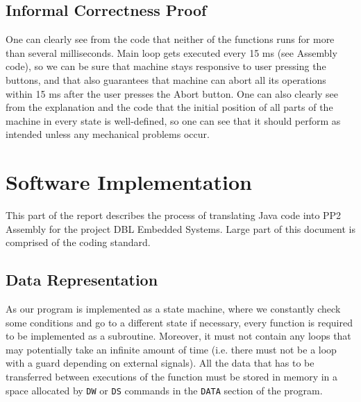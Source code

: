 \documentclass[a4paper,oneside,11pt]{report}
\begin{document}
\section{Informal Correctness Proof}
One can clearly see from the code that neither of the functions runs for more than several milliseconds. Main loop gets executed every 15 ms (see Assembly code), so we can be sure that machine stays responsive to user pressing the buttons, and that also guarantees that machine can abort all its operations within 15 ms after the user presses the Abort button. One can also clearly see from the explanation and the code that the initial position of all parts of the machine in every state is well-defined, so one can see that it should perform as intended unless any mechanical problems occur.

\chapter{Software Implementation}
This part of the report describes the process of translating Java code into PP2 Assembly for the project DBL Embedded Systems. Large part of this document is comprised of the coding standard.

\section{Data Representation}
As our program is implemented as a state machine, where we constantly check some conditions and go to a different state if necessary, every function is required to be implemented as a subroutine. Moreover, it must not contain any loops that may potentially take an infinite amount of time (i.e. there must not be a loop with a guard depending on external signals). All the data that has to be transferred between executions of the function must be stored in memory in a space allocated by \texttt{DW} or \texttt{DS} commands in the \texttt{DATA} section of the program.
\end{document}
